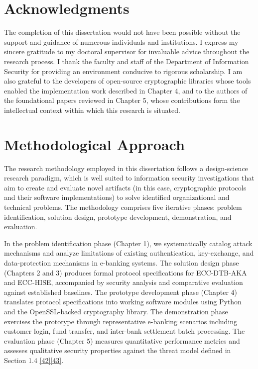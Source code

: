 \section{Acknowledgments}

\indent The completion of this dissertation would not have been possible without the support and guidance of numerous individuals and institutions. I express my sincere gratitude to my doctoral supervisor for invaluable advice throughout the research process. I thank the faculty and staff of the Department of Information Security for providing an environment conducive to rigorous scholarship. I am also grateful to the developers of open-source cryptographic libraries whose tools enabled the implementation work described in Chapter 4, and to the authors of the foundational papers reviewed in Chapter 5, whose contributions form the intellectual context within which this research is situated.

\section{Methodological Approach}

\indent The research methodology employed in this dissertation follows a design-science research paradigm, which is well suited to information security investigations that aim to create and evaluate novel artifacts (in this case, cryptographic protocols and their software implementations) to solve identified organizational and technical problems. The methodology comprises five iterative phases: problem identification, solution design, prototype development, demonstration, and evaluation.

\indent In the problem identification phase (Chapter 1), we systematically catalog attack mechanisms and analyze limitations of existing authentication, key-exchange, and data-protection mechanisms in e-banking systems. The solution design phase (Chapters 2 and 3) produces formal protocol specifications for ECC-DTB-AKA and ECC-HISE, accompanied by security analysis and comparative evaluation against established baselines. The prototype development phase (Chapter 4) translates protocol specifications into working software modules using Python and the OpenSSL-backed cryptography library. The demonstration phase exercises the prototype through representative e-banking scenarios including customer login, fund transfer, and inter-bank settlement batch processing. The evaluation phase (Chapter 5) measures quantitative performance metrics and assesses qualitative security properties against the threat model defined in Section 1.4 \hyperref[ref:42]{[42]}\hyperref[ref:43]{[43]}.

